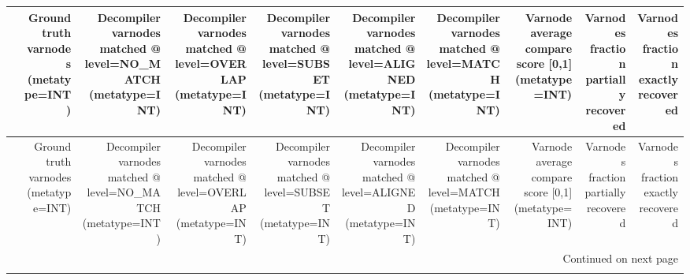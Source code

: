 \begin{longtable}{lrrrrrrrrr}
\toprule
{} &  Ground truth varnodes (metatype=INT) &  Decompiler varnodes matched @ level=NO\_MATCH (metatype=INT) &  Decompiler varnodes matched @ level=OVERLAP (metatype=INT) &  Decompiler varnodes matched @ level=SUBSET (metatype=INT) &  Decompiler varnodes matched @ level=ALIGNED (metatype=INT) &  Decompiler varnodes matched @ level=MATCH (metatype=INT) &  Varnode average compare score {[}0,1] (metatype=INT) &  Varnodes fraction partially recovered &  Varnodes fraction exactly recovered \\
\midrule
\endfirsthead

\toprule
{} &  Ground truth varnodes (metatype=INT) &  Decompiler varnodes matched @ level=NO\_MATCH (metatype=INT) &  Decompiler varnodes matched @ level=OVERLAP (metatype=INT) &  Decompiler varnodes matched @ level=SUBSET (metatype=INT) &  Decompiler varnodes matched @ level=ALIGNED (metatype=INT) &  Decompiler varnodes matched @ level=MATCH (metatype=INT) &  Varnode average compare score {[}0,1] (metatype=INT) &  Varnodes fraction partially recovered &  Varnodes fraction exactly recovered \\
\midrule
\endhead
\midrule
\multicolumn{10}{r}{{Continued on next page}} \\
\midrule
\endfoot


\end{longtable}
